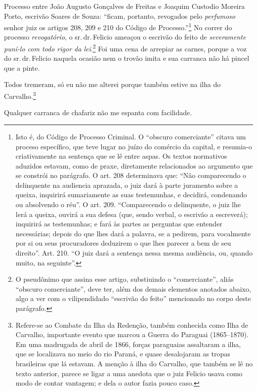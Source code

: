 Processo entre João Augusto Gonçalves de Freitas e Joaquim Custodio
Moreira Porto, escrivão Soares de Souza: ``ficam, portanto, revogados
pelo \emph{perfumoso} senhor juiz os artigos 208, 209 e 210 do Código de
Processo.''\footnote{ Isto é, do Código de Processo Criminal. O ``obscuro
  comerciante'' citava um proceso específico, que teve lugar no juízo do
  comércio da capital, e resumia-o criativamente na sentença que se lê
  entre aspas. Os textos normativos aduzidos estavam, como de praxe,
  diretamente relacionados ao argumento que se constrói no parágrafo. O
  art. 208 determinava que: ``Não comparecendo o delinquente na audiencia
  aprazada, o juiz dará à parte juramento sobre a queixa, inquirirá
  sumariamente as suas testemunhas, e decidirá, condenando ou absolvendo
  o réu''. O art. 209. ``Comparecendo o delinquente, o juiz lhe lerá a
  queixa, ouvirá a sua defesa (que, sendo verbal, o escrivão a
  escreverá); inquirirá as testemunhas; e fará às partes as perguntas
  que entender necessárias; depois do que lhes dará a palavra, se a
  pedirem, para vocalmente por si ou seus procuradores deduzirem o que
  lhes parecer a bem de seu direito''. Art. 210. ``O juiz dará a sentença
  nessa mesma audiência, ou, quando muito, na seguinte''.} No correr do
processo \emph{revogatório}, o sr.\,dr.\,Felicio ameaçou o escrivão do
feito de \emph{severamente puní-lo com todo rigor da lei}.\footnote{ O
  pseudônimo que assina esse artigo, substiuindo o ``comerciante'', aliás
  ``obscuro comerciante'', deve ter, além dos demais elementos anotados
  abaixo, algo a ver com o vilipendidado ``escrivão do feito'' mencionado
  no corpo deste parágrafo.} Foi uma cena de arrepiar as carnes, porque
a voz do sr.\,dr.\,Felicio naquela ocasião nem o trovão imita e sua
carranca não há pincel que a pinte.

Todos tremeram, só eu não me alterei porque também estive na ilha do
Carvalho.\footnote{ Refere-se ao Combate da Ilha da Redenção, também
  conhecida como Ilha de Carvalho, importante evento que marcou a Guerra
  do Paraguai (1865--1870). Em uma madrugada de abril de 1866, forças
  paraguaias assaltaram a ilha, que se localizava no meio do rio Paraná,
  e quase desalojaram as tropas brasileiras que lá estavam. A menção à
  ilha do Carvalho, que também se lê no texto anterior, parece se ligar
  a uma anedota que o juiz Felicio usava como modo de contar vantagem; e
  dela o autor fazia pouco caso.}


Qualquer carranca de chafariz não me espanta com facilidade.

